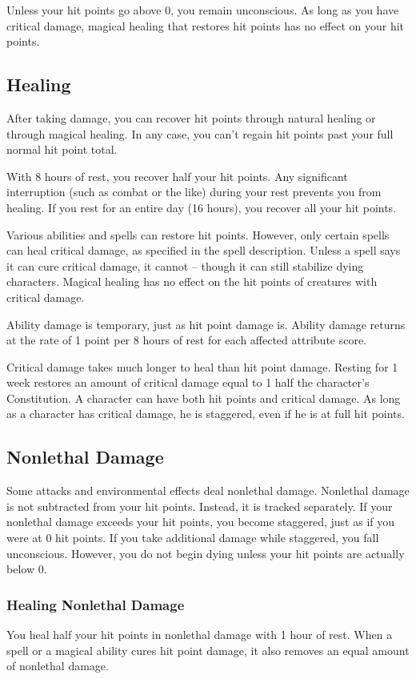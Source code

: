 Unless your hit points go above 0, you remain unconscious. As long as you have critical damage, magical healing that restores hit points has no effect on your hit points.

\subsection{Healing}
After taking damage, you can recover hit points through natural healing or through magical healing. In any case, you can't regain hit points past your full normal hit point total.

 With 8 hours of rest, you recover half your hit points. Any significant interruption (such as combat or the like) during your rest prevents you from healing. If you rest for an entire day (16 hours), you recover all your hit points.

 Various abilities and spells can restore hit points. However, only certain spells can heal critical damage, as specified in the spell description. Unless a spell says it can cure critical damage, it cannot -- though it can still stabilize dying characters. Magical healing has no effect on the hit points of creatures with critical damage.

 Ability damage is temporary, just as hit point damage is. Ability damage returns at the rate of 1 point per 8 hours of rest for each affected attribute score.

 Critical damage takes much longer to heal than hit point damage. Resting for 1 week restores an amount of critical damage equal to 1 \add half the character's Constitution. A character can have both hit points and critical damage. As long as a character has critical damage, he is staggered, even if he is at full hit points.

\subsection{Nonlethal Damage}
Some attacks and environmental effects deal nonlethal damage. Nonlethal damage is not subtracted from your hit points. Instead, it is tracked separately. If your nonlethal damage exceeds your hit points, you become staggered, just as if you were at 0 hit points. If you take additional damage while staggered, you fall unconscious. However, you do not begin dying unless your hit points are actually below 0. 

\subsubsection{Healing Nonlethal Damage}
You heal half your hit points in nonlethal damage with 1 hour of rest. When a spell or a magical ability cures hit point damage, it also removes an equal amount of nonlethal damage.

